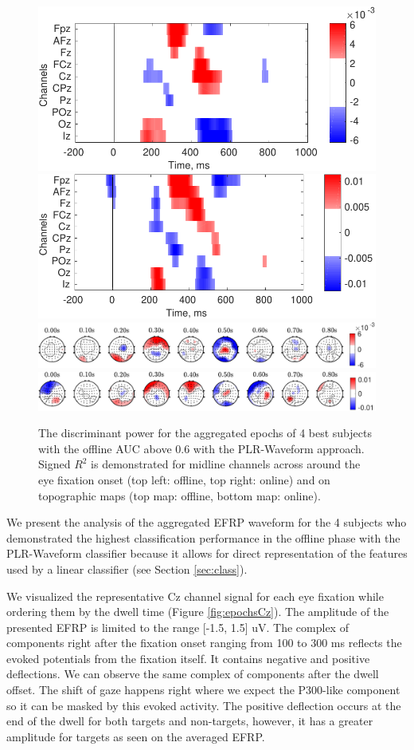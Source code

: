 \documentclass[12pt]{iopart}
\begin{document}
\begin{figure}[!t]
    \includegraphics[trim={0cm 0.01cm 0cm 0cm},clip,width=0.45\columnwidth]{../images/SignR_offline.pdf}
    \includegraphics[trim={0cm 0cm 0cm 0.01cm},clip,width=0.45\columnwidth]{../images/SignR_online.pdf}
    \includegraphics[trim={0cm 0cm 0cm 0cm},clip,width=0.9\columnwidth]{../images/offline/TopoPlot_TLock-start_signRSquare_Saggregate_objrec_subjects_popuponline_s1.pdf}
    \includegraphics[trim={0cm 0cm 0cm 0cm},clip,width=0.9\columnwidth]{../images/online/TopoPlot_TLock-start_signRSquare_Saggregate_objrec_subjects_popuponline_s1.pdf}
    \caption{The discriminant power for the aggregated epochs of
        4 best subjects with the offline AUC above 0.6 with the PLR-Waveform approach.
    Signed $R^2$ is demonstrated for midline channels across around the eye fixation onset
    (top left: offline, top right: online) and on topographic maps (top map: offline, bottom map: online).}
\label{fig:signR}
\end{figure}


We present the analysis of the aggregated EFRP waveform
for the 4 subjects who demonstrated
the highest classification performance in the offline phase with the 
PLR-Waveform classifier because it allows for direct representation
of the features used by a linear classifier (see Section \ref{sec:class}).

We visualized the representative Cz channel signal
for each eye fixation while ordering them
by the dwell time (Figure \ref{fig:epochsCz}).
The amplitude of the presented EFRP is limited to the range [-1.5, 1.5] uV.
The complex of components right after the fixation onset ranging from 100 to 300 ms
reflects the evoked potentials from the fixation itself. It contains
negative and positive deflections. We can observe the same complex of components
after the dwell offset. The shift of gaze happens right where we expect 
the P300-like component so it can be masked by this evoked activity.
The positive deflection occurs at the end of the dwell for both
targets and non-targets, however, it has a greater amplitude for targets
as seen on the averaged EFRP.
\end{document}
